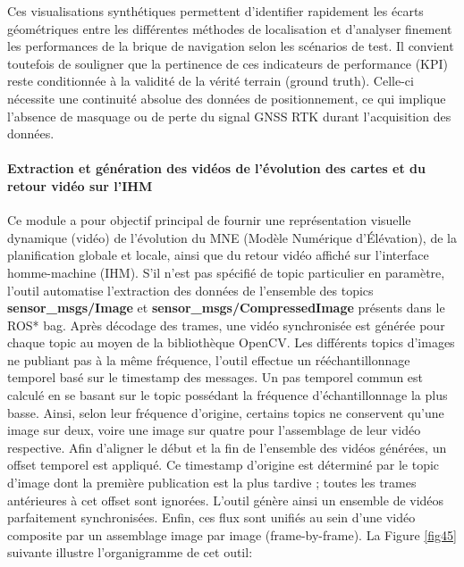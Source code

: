 \indent Ces visualisations synthétiques permettent d'identifier rapidement les écarts géométriques entre les différentes méthodes de localisation et d'analyser finement les performances de la brique de navigation selon les scénarios de test. Il convient toutefois de souligner que la pertinence de ces indicateurs de performance (KPI) reste conditionnée à la validité de la vérité terrain (ground truth). Celle-ci nécessite une continuité absolue des données de positionnement, ce qui implique l'absence de masquage ou de perte du signal GNSS RTK durant l'acquisition des données.\\


\paragraph{Extraction et génération des vidéos de l'évolution des cartes et du retour vidéo sur l'IHM}

Ce module a pour objectif principal de fournir une représentation visuelle dynamique (vidéo) de l'évolution du MNE (Modèle Numérique d'Élévation), de la planification globale et locale, ainsi que du retour vidéo affiché sur l'interface homme-machine (IHM). S'il n'est pas spécifié de topic particulier en paramètre, l'outil automatise l'extraction des données de l'ensemble des topics \textbf{sensor\_msgs/Image} et \textbf{sensor\_msgs/CompressedImage} présents dans le ROS* bag. Après décodage des trames, une vidéo synchronisée est générée pour chaque topic au moyen de la bibliothèque OpenCV. Les différents topics d'images ne publiant pas à la même fréquence, l'outil effectue un rééchantillonnage temporel basé sur le timestamp des messages. Un pas temporel commun est calculé en se basant sur le topic possédant la fréquence d'échantillonnage la plus basse. Ainsi, selon leur fréquence d'origine, certains topics ne conservent qu'une image sur deux, voire une image sur quatre pour l'assemblage de leur vidéo respective. Afin d'aligner le début et la fin de l'ensemble des vidéos générées, un offset temporel est appliqué. Ce timestamp d'origine est déterminé par le topic d'image dont la première publication est la plus tardive ; toutes les trames antérieures à cet offset sont ignorées. L'outil génère ainsi un ensemble de vidéos parfaitement synchronisées. Enfin, ces flux sont unifiés au sein d'une vidéo composite par un assemblage image par image (frame-by-frame).  La Figure \ref{fig45} suivante illustre l'organigramme de cet outil:\\


